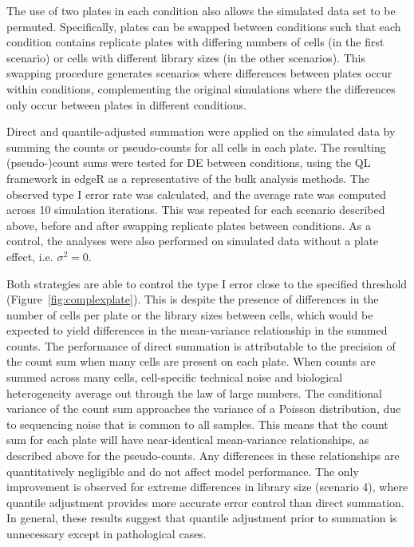 \documentclass{article}
\begin{document}
The use of two plates in each condition also allows the simulated data set to be permuted.
Specifically, plates can be swapped between conditions such that each condition contains replicate plates with differing numbers of cells (in the first scenario)
    or cells with different library sizes (in the other scenarios).
This swapping procedure generates scenarios where differences between plates occur within conditions, 
    complementing the original simulations where the differences only occur between plates in different conditions.

Direct and quantile-adjusted summation were applied on the simulated data by summing the counts or pseudo-counts for all cells in each plate.
The resulting (pseudo-)count sums were tested for DE between conditions, using the QL framework in edgeR as a representative of the bulk analysis methods.
The observed type I error rate was calculated, and the average rate was computed across 10 simulation iterations.
This was repeated for each scenario described above, before and after swapping replicate plates between conditions.
As a control, the analyses were also performed on simulated data without a plate effect, i.e. $\sigma^2=0$.

Both strategies are able to control the type I error close to the specified threshold (Figure~\ref{fig:complexplate}).
This is despite the presence of differences in the number of cells per plate or the library sizes between cells,
    which would be expected to yield differences in the mean-variance relationship in the summed counts.
The performance of direct summation is attributable to the precision of the count sum when many cells are present on each plate.
When counts are summed across many cells, cell-specific technical noise and biological heterogeneity average out through the law of large numbers.
The conditional variance of the count sum approaches the variance of a Poisson distribution, due to sequencing noise \cite{marioni2008rnaseq} that is common to all samples.
This means that the count sum for each plate will have near-identical mean-variance relationships, as described above for the pseudo-counts.
Any differences in these relationships are quantitatively negligible and do not affect model performance.
The only improvement is observed for extreme differences in library size (scenario 4), where quantile adjustment provides more accurate error control than direct summation.
In general, these results suggest that quantile adjustment prior to summation is unnecessary except in pathological cases.
\end{document}
